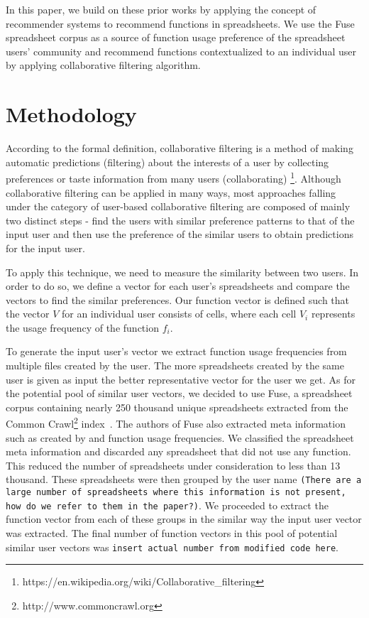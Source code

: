 \documentclass[conference]{IEEEtran}
\begin{document}
In this paper, we build on these prior works by applying the concept of recommender systems to recommend functions in spreadsheets. We use the Fuse spreadsheet corpus as a source of function usage preference of the spreadsheet users' community and recommend functions contextualized to an individual user by applying collaborative filtering algorithm.

\section{Methodology}
According to the formal definition, collaborative filtering is a method of making automatic predictions (filtering) about the interests of a user by collecting preferences or taste information from many users (collaborating) \footnote{https://en.wikipedia.org/wiki/Collaborative\_filtering}. Although collaborative filtering can be applied in many ways, most approaches falling under the category of user-based collaborative filtering are composed of mainly two distinct steps - find the users with similar preference patterns to that of the input user and then use the preference of the similar users to obtain predictions for the input user.

To apply this technique, we need to measure the similarity between two users. In order to do so, we define a vector for each user's spreadsheets and compare the vectors to find the similar preferences. Our function vector is defined such that the vector $V$ for an individual user consists of cells, where each cell $V_i$ represents the usage frequency of the function $f_i$.

To generate the input user's vector we extract function usage frequencies from multiple files created by the user. The more spreadsheets created by the same user is given as input the better representative vector for the user we get. As for the potential pool of similar user vectors, we decided to use Fuse, a spreadsheet corpus containing nearly 250 thousand unique spreadsheets extracted from the Common Crawl\footnote{http://www.commoncrawl.org} index~\cite{barik2015fuse}. The authors of Fuse also extracted meta information such as created by and function usage frequencies. We classified the spreadsheet meta information and discarded any spreadsheet that did not use any function. This reduced the number of spreadsheets under consideration to less than 13 thousand. These spreadsheets were then grouped by the user name \texttt{(There are a large number of spreadsheets where this information is not present, how do we refer to them in the paper?)}. We proceeded to extract the function vector from each of these groups in the similar way the input user vector was extracted. The final number of function vectors in this pool of potential similar user vectors was \texttt{insert actual number from modified code here}.
\end{document}
